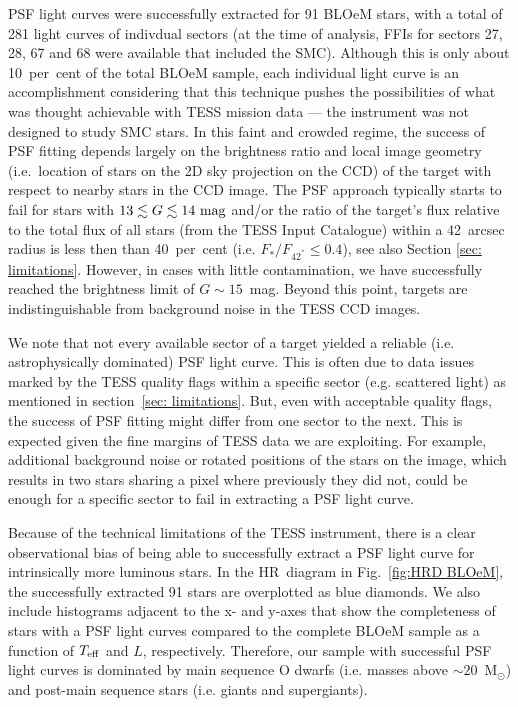 \documentclass[fleqn,usenatbib]{mnras}
\begin{document}
PSF light curves were successfully extracted for 91 BLOeM stars, with a total of 281 light curves of indivdual sectors (at the time of analysis, FFIs for sectors 27, 28, 67 and 68 were available that included the SMC). Although this is only about 10~per~cent of the total BLOeM sample, each individual light curve is an accomplishment considering that this technique pushes the possibilities of what was thought achievable with TESS mission data --- the instrument was not designed to study SMC stars. In this faint and crowded regime, the success of PSF fitting depends largely on the brightness ratio and local image geometry (i.e.\ location of stars on the 2D sky projection on the CCD) of the target with respect to nearby stars in the CCD image. The PSF approach typically starts to fail for stars with $13 \lesssim G \lesssim 14~\rm{mag}$ and/or the ratio of the target's flux relative to the total flux of all stars (from the TESS Input Catalogue) within a 42~arcsec radius is less then than 40~per~cent (i.e. $F_{*}/F_{42^{''}} \leq 0.4$), see also Section \ref{sec: limitations}. However, in cases with little contamination, we have successfully reached the brightness limit of $G\sim15$~mag. Beyond this point, targets are indistinguishable from background noise in the TESS CCD images.

We note that not every available sector of a target yielded a reliable (i.e. astrophysically dominated) PSF light curve. This is often due to data issues marked by the TESS quality flags within a specific sector (e.g. scattered light) as mentioned in section~\ref{sec: limitations}. But, even with acceptable quality flags, the success of PSF fitting might differ from one sector to the next. This is expected given the fine margins of TESS data we are exploiting. For example, additional background noise or rotated positions of the stars on the image, which results in two stars sharing a pixel where previously they did not, could be enough for a specific sector to fail in extracting a PSF light curve. 

Because of the technical limitations of the TESS instrument, there is a clear observational bias of being able to successfully extract a PSF light curve for intrinsically more luminous stars. In the HR~diagram in Fig.~\ref{fig:HRD BLOeM}, the successfully extracted 91 stars are overplotted as blue diamonds. We also include histograms adjacent to the x- and y-axes that show the completeness of stars with a PSF light curves compared to the complete BLOeM sample as a function of $T_{\rm eff}$ and $L$, respectively. Therefore, our sample with successful PSF light curves is dominated by main sequence O dwarfs (i.e. masses above $\sim 20$~M$_{\odot}$) and post-main sequence stars (i.e. giants and supergiants). 
\end{document}
